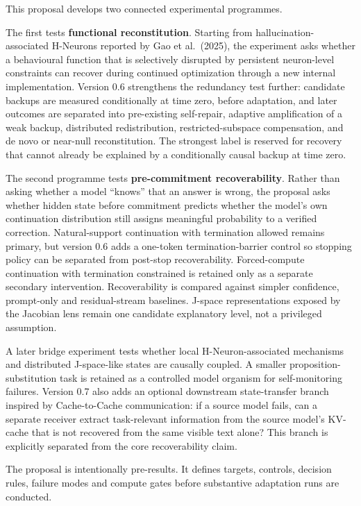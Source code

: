 \documentclass[11pt,a4paper]{article}
\begin{document}
This proposal develops two connected experimental programmes.

The first tests \textbf{functional reconstitution}. Starting from hallucination-associated H-Neurons reported by Gao et al.~(2025), the experiment asks whether a behavioural function that is selectively disrupted by persistent neuron-level constraints can recover during continued optimization through a new internal implementation. Version 0.6 strengthens the redundancy test further: candidate backups are measured conditionally at time zero, before adaptation, and later outcomes are separated into pre-existing self-repair, adaptive amplification of a weak backup, distributed redistribution, restricted-subspace compensation, and de novo or near-null reconstitution. The strongest label is reserved for recovery that cannot already be explained by a conditionally causal backup at time zero.

The second programme tests \textbf{pre-commitment recoverability}. Rather than asking whether a model ``knows'' that an answer is wrong, the proposal asks whether hidden state before commitment predicts whether the model's own continuation distribution still assigns meaningful probability to a verified correction. Natural-support continuation with termination allowed remains primary, but version 0.6 adds a one-token termination-barrier control so stopping policy can be separated from post-stop recoverability. Forced-compute continuation with termination constrained is retained only as a separate secondary intervention. Recoverability is compared against simpler confidence, prompt-only and residual-stream baselines. J-space representations exposed by the Jacobian lens remain one candidate explanatory level, not a privileged assumption.

A later bridge experiment tests whether local H-Neuron-associated mechanisms and distributed J-space-like states are causally coupled. A smaller proposition-substitution task is retained as a controlled model organism for self-monitoring failures. Version 0.7 also adds an optional downstream state-transfer branch inspired by Cache-to-Cache communication: if a source model fails, can a separate receiver extract task-relevant information from the source model's KV-cache that is not recovered from the same visible text alone? This branch is explicitly separated from the core recoverability claim.

The proposal is intentionally pre-results. It defines targets, controls, decision rules, failure modes and compute gates before substantive adaptation runs are conducted.
\end{document}
